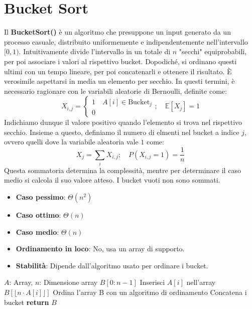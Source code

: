 \section{Bucket Sort}
Il \textbf{BucketSort()} è un algoritmo che presuppone un input generato da un processo casuale, distribuito uniformemente e indipendentemente nell'intervallo $[0,1)$. Intuitivamente divide l'intervallo in un totale di $n$ "secchi" equiprobabili, per poi associare i valori al rispettivo bucket. Dopodiché, si ordinano questi ultimi con un tempo lineare, per poi concatenarli e ottenere il risultato. È verosimile aspettarsi in media un elemento per secchio. In questi termini, è necessario ragionare con le variabili aleatorie di Bernoulli, definite come: \[X_{i,j} = \begin{cases}
	1\quad A[i]\in \text{Bucket}_j\\
	0
\end{cases};\quad \mathbb{E}[X_{j}] = 1\]
\noindent Indichiamo dunque il valore positivo quando l'elemento si trova nel rispettivo secchio. Insieme a questo, definiamo il numero di elmenti nel bucket a indice $j$, ovvero quelli dove la variabile aleatoria vale $1$ come: \[X_{j} = \sum_i X_{i,j};\quad P(X_{i,j} = 1) = \frac{1}{n}\]
\noindent Questa sommatoria determina la complessità, mentre per determinare il caso medio si calcola il suo valore atteso. I bucket vuoti non sono sommati. \begin{itemize}
	\item \textbf{Caso pessimo}: $\Theta(n^2)$
	\item \textbf{Caso ottimo}: $\Theta(n)$
	\item \textbf{Caso medio}: $\Theta(n)$
	\item \textbf{Ordinamento in loco}: No, usa un array di supporto.
	\item \textbf{Stabilità}: Dipende dall'algoritmo usato per ordinare i bucket.
\end{itemize}
\begin{algorithm}[h]
	\caption{bucketSort(A, n)}
	\begin{algorithmic}[i]
		\Require $A$: Array, $n$: Dimensione array
		\State $B[0:n-1]$ 
		\State
		 Inserisci $A[i]$ nell'array $B[\lfloor n\cdot A[i]\rfloor]$
		\EndFor
		 Ordina l'array B con un algoritmo di ordinamento
		\EndFor
		\State Concatena i bucket
		\State \textbf{return} $B$
	\end{algorithmic}
\end{algorithm}
